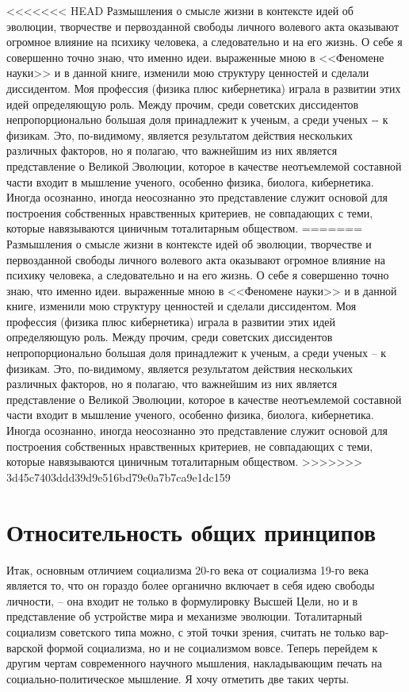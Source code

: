 \documentclass{book}
\begin{document}
<<<<<<< HEAD
Размышления о смысле жизни в контексте идей об эволюции, творчестве и первозданной свободы личного волевого акта оказывают огромное влияние на психику человека, а следо­вательно и на его жизнь. О себе я совершенно точно знаю, что именно идеи. выраженные мною в <<Феномене науки>> и в данной книге, изменили мою структуру ценностей и сделали диссиден­том. Моя профессия (физика плюс кибернетика) играла в раз­витии этих идей определяющую роль. Между прочим, среди советских диссидентов непропорционально большая доля при­надлежит к ученым, а среди ученых ‑- к физикам. Это, по‑видимому, является результатом действия нескольких различных факторов, но я полагаю, что важнейшим из них является представление о Великой Эволюции, которое в качестве неотъемлемой составной части входит в мышление ученого, особенно физика, биолога, кибернетика. Иногда осознанно, иногда неосоз­нанно это представление служит основой для построения собственных нравственных критериев, не совпадающих с теми, которые навязываются циничным тоталитарным обществом.
=======
Размышления о смысле жизни в контексте идей об эволюции, творчестве и первозданной свободы личного волевого акта оказывают огромное влияние на психику человека, а следо­вательно и на его жизнь. О себе я совершенно точно знаю, что именно идеи. выраженные мною в <<Феномене науки>> и в данной книге, изменили мою структуру ценностей и сделали диссиден­том. Моя профессия (физика плюс кибернетика) играла в раз­витии этих идей определяющую роль. Между прочим, среди советских диссидентов непропорционально большая доля при­надлежит к ученым, а среди ученых -- к физикам. Это, по-видимому, является результатом действия нескольких различных факторов, но я полагаю, что важнейшим из них является представление о Великой Эволюции, которое в качестве неотъемлемой составной части входит в мышление ученого, особенно физика, биолога, кибернетика. Иногда осознанно, иногда неосоз­нанно это представление служит основой для построения собственных нравственных критериев, не совпадающих с теми, которые навязываются циничным 
тоталитарным обществом.
>>>>>>> 3d45c7403ddd39d9e516bd79e0a7b7ca9e1dc159


\section{Относительность общих принципов}

Итак, основным отличием социализма 20-го века от социа­лизма 19-го века является то, что он гораздо более органично включает в себя идею свободы личности, -- она входит не только в формулировку Высшей Цели, но и в представление об устрой­стве мира и механизме эволюции. Тоталитарный социализм со­ветского типа можно, с этой точки зрения, считать не только вар­варской формой социализма, но и не социализмом вовсе. Теперь перейдем к другим чертам современного научного мышления, накладывающим печать на социально-политическое мышление. Я хочу отметить две таких черты.
\end{document}
